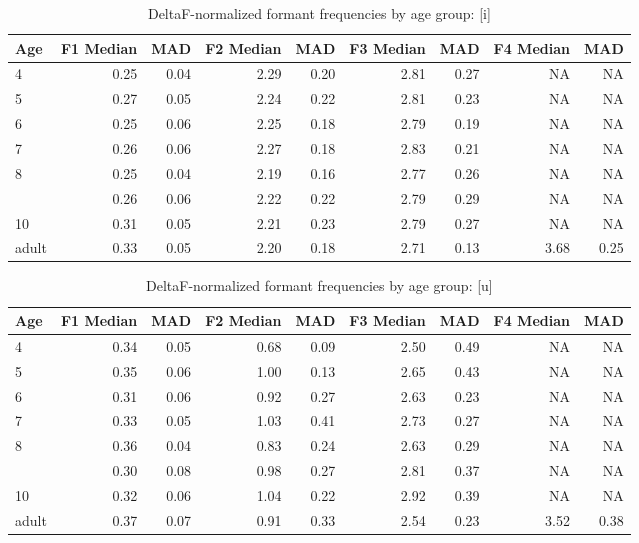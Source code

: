 \documentclass[
]{article}
\begin{document}
\begin{table}[!h]

\caption{\label{tab:deltaf-measurement-table-i}DeltaF-normalized formant frequencies by age group: [i]}
\centering
\begin{tabular}[t]{lrrrrrrrr}
\toprule
Age & F1 Median & MAD & F2 Median & MAD & F3 Median & MAD & F4 Median & MAD\\
\midrule
4 & 0.25 & 0.04 & 2.29 & 0.20 & 2.81 & 0.27 & NA & NA\\
5 & 0.27 & 0.05 & 2.24 & 0.22 & 2.81 & 0.23 & NA & NA\\
6 & 0.25 & 0.06 & 2.25 & 0.18 & 2.79 & 0.19 & NA & NA\\
7 & 0.26 & 0.06 & 2.27 & 0.18 & 2.83 & 0.21 & NA & NA\\
8 & 0.25 & 0.04 & 2.19 & 0.16 & 2.77 & 0.26 & NA & NA\\
\addlinespace
9 & 0.26 & 0.06 & 2.22 & 0.22 & 2.79 & 0.29 & NA & NA\\
10 & 0.31 & 0.05 & 2.21 & 0.23 & 2.79 & 0.27 & NA & NA\\
adult & 0.33 & 0.05 & 2.20 & 0.18 & 2.71 & 0.13 & 3.68 & 0.25\\
\bottomrule
\end{tabular}
\end{table}

\begin{table}[!h]

\caption{\label{tab:deltaf-measurement-table-u}DeltaF-normalized formant frequencies by age group: [u]}
\centering
\begin{tabular}[t]{lrrrrrrrr}
\toprule
Age & F1 Median & MAD & F2 Median & MAD & F3 Median & MAD & F4 Median & MAD\\
\midrule
4 & 0.34 & 0.05 & 0.68 & 0.09 & 2.50 & 0.49 & NA & NA\\
5 & 0.35 & 0.06 & 1.00 & 0.13 & 2.65 & 0.43 & NA & NA\\
6 & 0.31 & 0.06 & 0.92 & 0.27 & 2.63 & 0.23 & NA & NA\\
7 & 0.33 & 0.05 & 1.03 & 0.41 & 2.73 & 0.27 & NA & NA\\
8 & 0.36 & 0.04 & 0.83 & 0.24 & 2.63 & 0.29 & NA & NA\\
\addlinespace
9 & 0.30 & 0.08 & 0.98 & 0.27 & 2.81 & 0.37 & NA & NA\\
10 & 0.32 & 0.06 & 1.04 & 0.22 & 2.92 & 0.39 & NA & NA\\
adult & 0.37 & 0.07 & 0.91 & 0.33 & 2.54 & 0.23 & 3.52 & 0.38\\
\bottomrule
\end{tabular}
\end{table}
\end{document}
